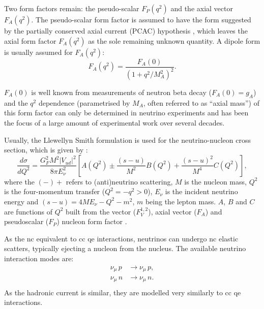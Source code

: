 Two form factors remain: the pseudo-scalar $F_P(q^2)$ and the axial vector $F_A(q^2)$. The pseudo-scalar form factor is assumed to have the form suggested by the partially conserved axial current (PCAC) hypothesis
\cite{llewellyn}, which leaves the axial form factor $F_A(q^2)$ as the sole remaining unknown quantity. A dipole form is usually assumed for $F_A(q^2)$:
\begin{equation}
\label{eq:axial_mass}
F_A(q^2) = \frac{F_A(0)}{\left( 1+q^2/M_A^2 \right)^2}.
\end{equation}

$F_A(0)$ is well known from measurements of neutron beta decay ($F_A(0) = g_A$) and the $q^2$ dependence (parametrised by $M_A$, often referred to as ``axial mass'') of this form factor can only be determined in neutrino experiments and has been the focus of a large amount of experimental work over several decades.  
%

Usually, the Llewellyn Smith formulation is used for the neutrino-nucleon cross section, which is given by \cite{llewellyn}:
\begin{equation}
\label{eq:llsmith}
\frac{d\sigma}{dQ^2} = \frac{G_F^2M^2|V_{ud}|^2}{8\pi E_\nu^2} \left [ A(Q^2) \pm \frac{(s-u)}{M^2} B(Q^2) + \frac{(s-u)^2}{M^4} C(Q^2)  \right ],
\end{equation}
where the $(-)+$ refers to (anti)neutrino scattering, $M$ is the nucleon mass, $Q^2$ is the four-momentum transfer ($Q^2 = -q^2 > 0$), $E_\nu$ is the incident neutrino energy and $(s - u) = 4ME_\nu - Q^2 - m^2$, $m$ being the lepton mass. $A$, $B$ and $C$ are functions of $Q^2$ built from the vector ($F_V^{1,2}$), axial vector ($F_A$) and pseudoscalar ($F_P$) nucleon form factor \cite{llewellyn}.


As the \acrshort{nc} equivalent to \acrshort{cc} \acrshort{qe} interactions, neutrinos can undergo \acrshort{nc} elastic scatters, typically ejecting a nucleon from the nucleus. The available neutrino interaction modes are:
\begin{equation}
\begin{split}
\nu_\mu \, p & \rightarrow \nu_\mu \, p, \\
\nu_\mu \, n & \rightarrow \nu_\mu \, n. \\
\end{split}
\end{equation}
 As the hadronic current is similar, they are modelled very similarly to \acrshort{cc} \acrshort{qe} interactions.



